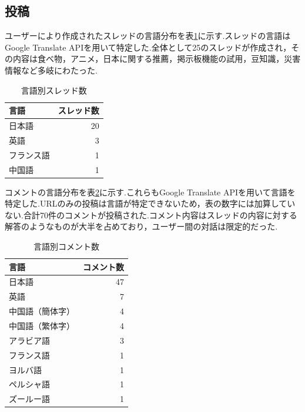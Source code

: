 \documentclass[b5paper,12pt,dvipdfmx]{jsreport}
\begin{document}
\subsection{投稿}

ユーザーにより作成されたスレッドの言語分布を表\ref{tab:thread-language}に示す.スレッドの言語はGoogle Translate APIを用いて特定した.全体として25のスレッドが作成され，その内容は食べ物，アニメ，日本に関する推薦，掲示板機能の試用，豆知識，災害情報など多岐にわたった.


\begin{table}[H]
    \centering
    \caption{言語別スレッド数}
    \label{tab:thread-language}
    \begin{tabular}{|l|r|}
        \hline
        \textbf{言語} & \textbf{スレッド数} \\ \hline
        日本語       & 20               \\
        英語         & 3                 \\
        フランス語    & 1                 \\
        中国語       & 1                 \\ \hline
    \end{tabular}
\end{table}

コメントの言語分布を表\ref{tab:language-detection}に示す.これらもGoogle Translate APIを用いて言語を特定した.URLのみの投稿は言語が特定できないため，表の数字には加算していない.合計70件のコメントが投稿された.コメント内容はスレッドの内容に対する解答のようなものが大半を占めており，ユーザー間の対話は限定的だった.


\begin{table}[H]
    \centering
    \caption{言語別コメント数}
    \label{tab:language-detection}
    \begin{tabular}{|l|r|}
        \hline
        \textbf{言語} & \textbf{コメント数} \\ \hline
        日本語       & 47           \\
        英語         & 7             \\
        中国語（簡体字） & 4             \\
        中国語（繁体字） & 4             \\ 
        アラビア語     & 3             \\
        フランス語     & 1             \\
        ヨルバ語       & 1             \\
        ペルシャ語     & 1             \\
        ズールー語     & 1             \\\hline
    \end{tabular}
\end{table}
\end{document}
